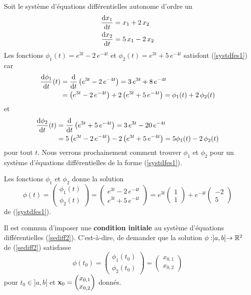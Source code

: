 {\begin{egg}
Soit le système d'équations différentielles autonome d'ordre un
\begin{equation}\label{systdfes1}
\begin{split}
\dydx{x_1}{t} &= x_1 + 2\,x_2\\
\dydx{x_2}{t} &= 5\,x_1 - 2\,x_2
\end{split}
\end{equation}
Les fonctions $\phi_1(t) = e^{3t}-2\,e^{-4t}$ et
$\phi_2(t) = e^{3t}+5\,e^{-4t}$ satisfont (\ref{systdfes1}) car
\begin{align*}
\dydx{\phi_1}{t}(t) &= \dfdx{\left(e^{3t}-2\,e^{-4t}\right)}{t}
= 3\,e^{3t}+8\,e^{-4t} \\
&= \left(e^{3t}-2\,e^{-4t}\right) +2\left(e^{3t}+5\,e^{-4t}\right)
= \phi_1(t) + 2\,\phi_2(t)
\end{align*}
et
\begin{align*}
\dydx{\phi_2}{t}(t) &= \dfdx{\left(e^{3t}+5\,e^{-4t}\right)}{t}
= 3\,e^{3t}-20\,e^{-4t} \\
&= 5\left(e^{3t}-2\,e^{-4t}\right) -2\left(e^{3t}+5\,e^{-4t}\right)
= 5\phi_1(t) - 2\,\phi_2(t)
\end{align*}
pour tout $t$.  Nous verrons prochainement comment trouver $\phi_1$ et
$\phi_2$ pour un système d'équations différentielles de la forme
(\ref{systdfes1}).

Les fonctions $\phi_1$ et $\phi_2$ donne la solution
\[
\phi(t) =
\begin{pmatrix}
\phi_1(t) \\
\phi_2(t)
\end{pmatrix}
=
\begin{pmatrix}
e^{3t}-2\,e^{-4t} \\ e^{3t}+5\,e^{-4t}
\end{pmatrix}
= e^{3t} \begin{pmatrix} 1 \\ 1 \end{pmatrix}
+ e^{-4t} \begin{pmatrix} -2 \\ 5 \end{pmatrix}
\]
de (\ref{systdfes1}).
\label{syst_egg0}
\end{egg}

Il est commun d'imposer une {\bfseries condition initiale} au système d'équations
différentielles (\ref{sediff2}).  C'est-à-dire, de demander que la solution
$\phi:]a,b[\rightarrow \RR^2$ de (\ref{sediff2}) satisfasse
\[
  \phi(t_0) = \begin{pmatrix} \phi_1(t_0) \\ \phi_2(t_0) \end{pmatrix}
  = \begin{pmatrix} x_{0,1} \\ x_{0,2} \end{pmatrix}
\]
pour $t_0\in]a,b[$ et
$\displaystyle \VEC{x}_0 = \begin{pmatrix} x_{0,1} \\ x_{0,2} \end{pmatrix}$
donnés.

}
